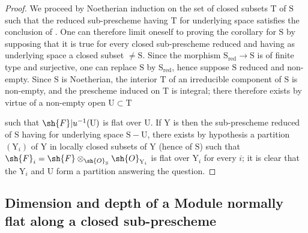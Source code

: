 \begin{proof}
We proceed by Noetherian induction  on the set of closed subsets $\mathrm{T}$ of $\mathrm{S}$ such that the reduced sub-prescheme having $\mathrm{T}$ for underlying space satisfies the conclusion of . One can therefore limit oneself to proving the corollary for $\mathrm{S}$ by supposing that it is true for every closed sub-prescheme reduced and having as underlying space a closed subset $\neq\mathrm{S}$. Since the morphism $\mathrm{S}_\mathrm{red}\to\mathrm{S}$ is of finite type and surjective, one can replace $\mathrm{S}$ by $\mathrm{S}_\mathrm{red}$, hence suppose $\mathrm{S}$ reduced and non-empty. Since $\mathrm{S}$ is Noetherian, the interior $\mathrm{T}$ of an irreducible component of $\mathrm{S}$ is non-empty, and the prescheme induced on $\mathrm{T}$ is integral; there therefore exists by virtue of  a non-empty open $\mathrm{U}\subset\mathrm{T}$


such that $\sh{F}|u^{-1}(\mathrm{U})$ is flat over $\mathrm{U}$. If $\mathrm{Y}$ is then the sub-prescheme reduced of $\mathrm{S}$ having for underlying space $\mathrm{S}-\mathrm{U}$, there exists by hypothesis a partition $(\mathrm{Y}_i)$ of $\mathrm{Y}$ in locally closed subsets of $\mathrm{Y}$ (hence of $\mathrm{S}$) such that $\sh{F}_i=\sh{F}\otimes_{\sh{O}_\mathrm{S}}\sh{O}_{\mathrm{Y}_i}$ is flat over $\mathrm{Y}_i$ for every $i$; it is clear that the $\mathrm{Y}_i$ and $\mathrm{U}$ form a partition answering the question.
\end{proof}

\subsection{Dimension and depth of a Module normally flat along a closed sub-prescheme}
\label{subsection:IV.6.10}


